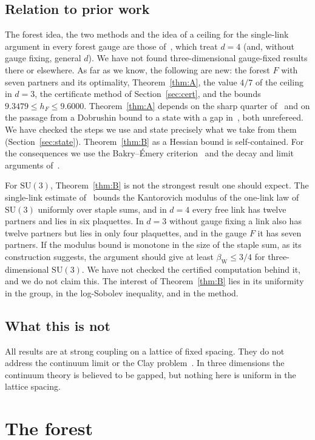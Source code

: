 \documentclass[11pt]{amsart}
\theoremstyle{definition}
\theoremstyle{remark}
\newcommand{\SU}{\mathrm{SU}}
\begin{document}
\subsection*{Relation to prior work}
The forest idea, the two methods and the idea of a ceiling for the single-link argument in every forest gauge are
those of~\cite{BBL,BB-zen}, which treat $d=4$ (and, without gauge fixing, general $d$). We have not found
three-dimensional gauge-fixed results there or elsewhere. As far as we know, the following are new: the forest $F$ with
seven partners and its optimality, Theorem~\ref{thm:A}, the value $4/7$ of the ceiling in $d=3$, the certificate
method of Section~\ref{sec:cert}, and the bounds $9.3479\le h_F\le9.6000$. Theorem~\ref{thm:A} depends on the sharp
quarter of~\cite{BB-zen} and on the passage from a Dobrushin bound to a state with a gap in~\cite{BBL}, both
unrefereed. We have checked the steps we use and state precisely what we take from them (Section~\ref{sec:state}).
Theorem~\ref{thm:B} as a Hessian bound is self-contained. For the consequences we use the Bakry--\'Emery
criterion~\cite{BE} and the decay and limit arguments of~\cite{SZZ,BBL}.

For $\SU(3)$, Theorem~\ref{thm:B} is not the strongest result one should expect. The single-link estimate
of~\cite[Thm.~6]{BBL} bounds the Kantorovich modulus of the one-link law of $\SU(3)$ uniformly over staple sums, and
in $d=4$ every free link has twelve partners and lies in six plaquettes. In $d=3$ without gauge fixing a link also has
twelve partners but lies in only four plaquettes, and in the gauge $F$ it has seven partners. If the modulus bound
is monotone in the size of the staple sum, as its construction suggests, the argument should give at least
$\beta_{\mathrm W}\le3/4$ for three-dimensional $\SU(3)$. We have not checked the certified computation behind it,
and we do not claim this. The interest of Theorem~\ref{thm:B} lies in its uniformity in the group, in the
log-Sobolev inequality, and in the method.

\subsection*{What this is not}
All results are at strong coupling on a lattice of fixed spacing. They do not address the continuum limit or the Clay
problem~\cite{JW}. In three dimensions the continuum theory is believed to be gapped, but nothing here is uniform in
the lattice spacing.

\section{The forest}\label{sec:forest}
\end{document}
